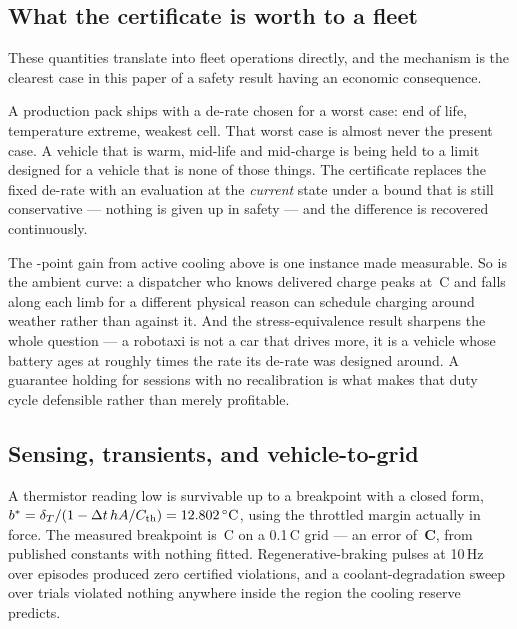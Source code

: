 \documentclass[11pt,letterpaper]{article}
\theoremstyle{definition}
\theoremstyle{remark}
\newcommand{\SI}[2]{#1\,#2}
\newcommand{\degreeCelsius}{\degC}
\newcommand{\degC}{\ifmmode{^\circ}\mathrm{C}\else\textdegree C\fi}
\begin{document}
\subsection{What the certificate is worth to a fleet}

These quantities translate into fleet operations directly, and the mechanism is the clearest
case in this paper of a safety result having an economic consequence.

A production pack ships with a de-rate chosen for a worst case: end of life, temperature
extreme, weakest cell. That worst case is almost never the present case. A vehicle that is warm,
mid-life and mid-charge is being held to a limit designed for a vehicle that is none of those
things. The certificate replaces the fixed de-rate with an evaluation at the \emph{current}
state under a bound that is still conservative --- nothing is given up in safety --- and the
difference is recovered continuously.

The \gLoopGain{}-point gain from active cooling above is one instance made measurable. So is the
ambient curve: a dispatcher who knows delivered charge peaks at \SI{\gPeakAmb}{\degreeCelsius} and falls
along each limb for a different physical reason can schedule charging around weather rather than
against it. And the stress-equivalence result sharpens the whole question --- a robotaxi is not
a car that drives more, it is a vehicle whose battery ages at roughly \gStressRatio{} times the
rate its de-rate was designed around. A guarantee holding for \gRoboSessions{} sessions with no
recalibration is what makes that duty cycle defensible rather than merely profitable.

\subsection{Sensing, transients, and vehicle-to-grid}

A thermistor reading low is survivable up to a breakpoint with a closed form,
$b^\ast = \delta_T/(1 - \Delta t\, hA / C_{\mathrm{th}}) = \SI{\gBiasPred}{\degreeCelsius}$, using the
throttled margin actually in force. The measured breakpoint is \SI{\gBiasMeas}{\degreeCelsius} on a
\SI{0.1}{\degreeCelsius} grid --- an error of \textbf{\SI{\gBiasErr}{\degreeCelsius}}, from published constants with
nothing fitted. Regenerative-braking pulses at 10\,Hz over \gRegenN{} episodes produced zero
certified violations, and a coolant-degradation sweep over \gCoolTrials{} trials violated
nothing anywhere inside the region the cooling reserve predicts.
\end{document}
